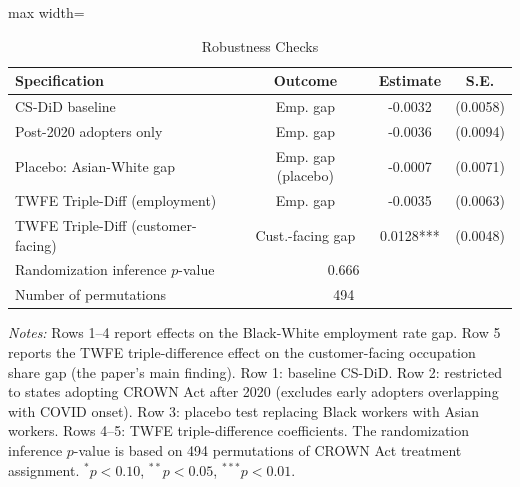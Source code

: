 \begin{table}[htbp]
\centering
\caption{Robustness Checks}
\label{tab:robustness}
\begin{adjustbox}{max width=\textwidth}
\begin{tabular}{lccc}
\toprule
Specification & Outcome & Estimate & S.E. \\
\midrule
CS-DiD baseline & Emp. gap & -0.0032 & (0.0058) \\
Post-2020 adopters only & Emp. gap & -0.0036 & (0.0094) \\
Placebo: Asian-White gap & Emp. gap (placebo) & -0.0007 & (0.0071) \\
TWFE Triple-Diff (employment) & Emp. gap & -0.0035 & (0.0063) \\
TWFE Triple-Diff (customer-facing) & Cust.-facing gap & 0.0128*** & (0.0048) \\
\midrule
Randomization inference $p$-value & \multicolumn{2}{c}{0.666} \\
Number of permutations & \multicolumn{2}{c}{494} \\
\bottomrule
\end{tabular}
\end{adjustbox}
\begin{tablenotes}[flushleft]
\small
\item \textit{Notes:} Rows 1--4 report effects on the Black-White employment rate gap. Row 5 reports the TWFE triple-difference effect on the customer-facing occupation share gap (the paper's main finding). Row 1: baseline CS-DiD. Row 2: restricted to states adopting CROWN Act after 2020 (excludes early adopters overlapping with COVID onset). Row 3: placebo test replacing Black workers with Asian workers. Rows 4--5: TWFE triple-difference coefficients. The randomization inference $p$-value is based on 494 permutations of CROWN Act treatment assignment. $^{*}p<0.10$, $^{**}p<0.05$, $^{***}p<0.01$.
\end{tablenotes}
\end{table}
